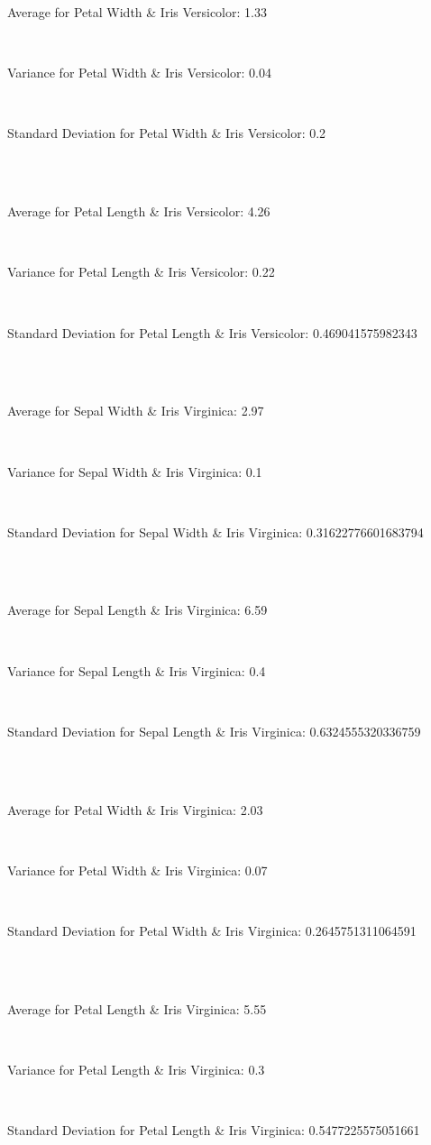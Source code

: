 \documentclass[12pt,a4paper,titlepage]{article}
\begin{document}
{{{\centerline{Average for Petal Width \& Iris Versicolor: 1.33}~\\
\centerline{Variance for Petal Width \& Iris Versicolor: 0.04}~\\
\centerline{Standard Deviation for Petal Width \& Iris Versicolor: 0.2}~\\~\\
\centerline{Average for Petal Length \& Iris Versicolor: 4.26}~\\
\centerline{Variance for Petal Length \& Iris Versicolor: 0.22}~\\
\centerline{Standard Deviation for Petal Length \& Iris Versicolor: 0.469041575982343}~\\~\\
\centerline{Average for Sepal Width \& Iris Virginica: 2.97}~\\
\centerline{Variance for Sepal Width \& Iris Virginica: 0.1}~\\
\centerline{Standard Deviation for Sepal Width \& Iris Virginica: 0.31622776601683794}~\\~\\
\centerline{Average for Sepal Length \& Iris Virginica: 6.59}~\\
\centerline{Variance for Sepal Length \& Iris Virginica: 0.4}~\\
\centerline{Standard Deviation for Sepal Length \& Iris Virginica: 0.6324555320336759}~\\~\\
\centerline{Average for Petal Width \& Iris Virginica: 2.03}~\\
\centerline{Variance for Petal Width \& Iris Virginica: 0.07}~\\
\centerline{Standard Deviation for Petal Width \& Iris Virginica: 0.2645751311064591}~\\~\\
\centerline{Average for Petal Length \& Iris Virginica: 5.55}~\\
\centerline{Variance for Petal Length \& Iris Virginica: 0.3}~\\
\centerline{Standard Deviation for Petal Length \& Iris Virginica: 0.5477225575051661}~\\~\\
}\label{sub:sub2}%
}}
\end{document}
